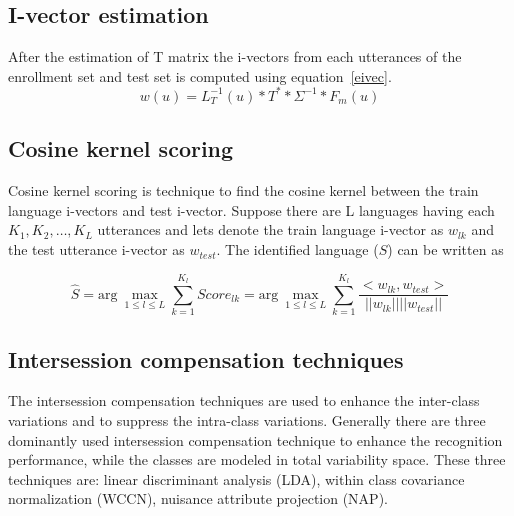 \begin{spacing}{1.5}
 \subsection{I-vector estimation}
 After the estimation of T matrix the i-vectors from each utterances of the enrollment set and test set is computed using equation~\ref{eivec}.
 \begin{equation}
 \label{eivec}
    w(u)= L_{T}^{-1}(u)*T^{*}*\Sigma^{-1}*F_{m}(u)
 \end{equation}
 
 \subsection{Cosine kernel scoring}
 Cosine kernel scoring is technique to find the cosine kernel between the train language i-vectors and test i-vector. Suppose there are L languages having each $K_{1},K_{2}, \ldots, K_{L}$ utterances and lets denote the train language i-vector as $w_{lk}$ and the test utterance i-vector as $w_{test}$. The identified language ($\hat{S}$) can be written as
 
 \begin{equation}
     \hat{S}=\mbox{arg}~\max_{1 \leq l \leq L} \sum_{k=1}^{K_{l}} Score_{lk}=\mbox{arg}~\max_{1 \leq l \leq L} \sum_{k=1}^{K_{l}} \frac{<w_{lk},w_{test}>}{||w_{lk}||||w_{test}||}
 \end{equation}
 
 \subsection{Intersession compensation techniques}
 \label{lda}
 The intersession compensation techniques are used to enhance the inter-class variations and to suppress the intra-class variations.  Generally there are three dominantly used intersession compensation technique to enhance the recognition performance, while the classes are modeled in total variability space. These three techniques are: linear discriminant analysis (LDA), within class covariance normalization (WCCN), nuisance attribute projection (NAP). 

\end{spacing}
